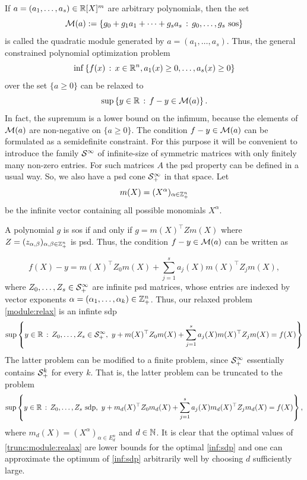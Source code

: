 \label{quadr:modules:pop}

If $a=(a_1,\ldots,a_s) \in \mathbb{R}[X]^m$ are arbitrary polynomials, then the set 
\[
	\mathcal{M}(a):= \left\{ g_0 + g_1 a_1 + \cdots + g_s a_s \,:\, g_0,\ldots,g_s \ \text{sos} \right\}
\]
is called the quadratic module generated by $a=(a_1,\ldots,a_s)$. Thus, the general constrained polynomial optimization problem 
\begin{equation}
	\label{constr:pop}
	\inf \left\{ f(x) \,:\, x \in \mathbb{R}^n, a_1(x) \ge 0,\ldots, a_s(x) \ge 0 \right\}
\end{equation}
over the set $\{a \ge 0\}$
can be relaxed to
\begin{equation}
	\label{module:relax}
	\sup \left\{ y \in \mathbb{R} \,:\, f - y\in \mathcal{M}(a) \right\}.
\end{equation}
In fact, the supremum is a lower bound on the infimum, because the elements of $\mathcal{M}(a)$ are non-negative on $\{a \ge 0\}$. The condition $f - y \in \mathcal{M}(a)$ can be formulated as a semidefinite constraint. For this purpose it will be convenient to introduce the family $\mathcal{S}^\infty$ of infinite-size of symmetric matrices with only finitely many non-zero entries. For such matrices $A$ the psd property can be defined in a usual way. So, we also have a psd cone $\mathcal{S}_+^\infty$ in that space. Let 
\[
	m(X) = (X^\alpha)_{\alpha \in \mathbb{Z}_+^n}
\] 
be the infinite vector containing all possible monomials $X^\alpha$. 

A polynomial $g$ is sos if and only if $g=m(X)^\top Z m(X)$ where $Z = (z_{\alpha,\beta})_{\alpha,\beta \in \mathbb{Z}_+^n}$ is psd. Thus, the condition $f - y \in \mathcal{M}(a)$ can be written as 

\begin{equation}
 f(X) - y = m(X)^\top Z_0 m(X) + \sum_{j=1}^s a_j(X) m(X)^\top Z_j m(X),
 \label{eq:quadr:mod:conditions}
\end{equation} 
where $Z_0,\ldots,Z_s \in \mathcal{S}_+^\infty$ are infinite psd matrices, whose entries are indexed by vector exponents $\alpha = (\alpha_1,\ldots,\alpha_k) \in \mathbb{Z}_+^n$. Thus, our relaxed problem \eqref{module:relax} is an infinte sdp
\begin{equation}
	\label{inf:sdp}
	\sup \left\{ y \in \mathbb{R} \,:\, Z_0,\ldots,Z_s \in \mathcal{S}_+^\infty, \ y + m(X)^\top Z_0 m(X) + \sum_{j=1}^s a_j(X) m(X)^\top Z_j m(X) =f(X) \right\}
\end{equation}
The latter problem can be modified to a finite problem, since $\mathcal{S}_+^\infty$ essentially contains $\mathcal{S}_+^k$ for every $k$. That is, the latter problem can be truncated to the problem 
\begin{equation}
	\label{trunc:module:realax}
	\sup \left\{ y \in \mathbb{R} \,:\, Z_0,\ldots,Z_s \ \text{sdp}, \ y + m_d(X)^\top Z_0 m_d(X) + \sum_{j=1}^s a_j(X) m_d(X)^\top Z_j m_d(X) = f(X) \right\},
\end{equation}
where $m_d(X) = (X^\alpha)_{\alpha \in E_d^n}$ and $d \in \mathbb{N}$. It is clear that the optimal values of \eqref{trunc:module:realax} are lower bounds for the optimal \eqref{inf:sdp} and one can approximate the optimum of \eqref{inf:sdp} arbitrarily well by choosing $d$ sufficiently large.


